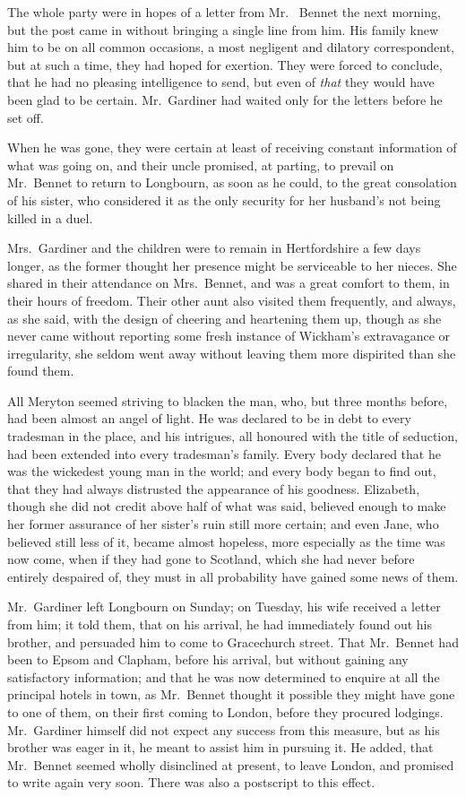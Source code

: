 
The whole party were in hopes of a letter from Mr.\ %
Bennet the next morning, but the post came in without
bringing a single line from him. His family knew him to
be on all common occasions, a most negligent and dilatory
correspondent, but at such a time, they had hoped for
exertion. They were forced to conclude, that he had no
pleasing intelligence to send, but even of \textit{that} they would
have been glad to be certain. Mr.\ Gardiner had waited
only for the letters before he set off.

When he was gone, they were certain at least of receiving
constant information of what was going on, and their
uncle promised, at parting, to prevail on Mr.\ Bennet to
return to Longbourn, as soon as he could, to the great
consolation of his sister, who considered it as the only
security for her husband’s not being killed in a duel.

Mrs.\ Gardiner and the children were to remain in Hertfordshire
a few days longer, as the former thought her
presence might be serviceable to her nieces. She shared
in their attendance on Mrs.\ Bennet, and was a great
comfort to them, in their hours of freedom. Their other
aunt also visited them frequently, and always, as she said,
with the design of cheering and heartening them up,
though as she never came without reporting some fresh
instance of Wickham’s extravagance or irregularity, she
seldom went away without leaving them more dispirited
than she found them.

All Meryton seemed striving to blacken the man, who,
but three months before, had been almost an angel of
light. He was declared to be in debt to every tradesman
in the place, and his intrigues, all honoured with the title
of seduction, had been extended into every tradesman’s
family. Every body declared that he was the wickedest
young man in the world; and every body began to find
out, that they had always distrusted the appearance of
his goodness. Elizabeth, though she did not credit above
half of what was said, believed enough to make her former
assurance of her sister’s ruin still more certain; and even
Jane, who believed still less of it, became almost hopeless,
more especially as the time was now come, when if they
had gone to Scotland, which she had never before entirely
despaired of, they must in all probability have gained
some news of them.

Mr.\ Gardiner left Longbourn on Sunday; on Tuesday,
his wife received a letter from him; it told them, that
on his arrival, he had immediately found out his brother,
and persuaded him to come to Gracechurch street. That
Mr.\ Bennet had been to Epsom and Clapham, before his
arrival, but without gaining any satisfactory information;
and that he was now determined to enquire at all the
principal hotels in town, as Mr.\ Bennet thought it possible
they might have gone to one of them, on their first coming
to London, before they procured lodgings. Mr.\ Gardiner
himself did not expect any success from this measure,
but as his brother was eager in it, he meant to assist him
in pursuing it. He added, that Mr.\ Bennet seemed wholly
disinclined at present, to leave London, and promised to
write again very soon. There was also a postscript to this
effect.

